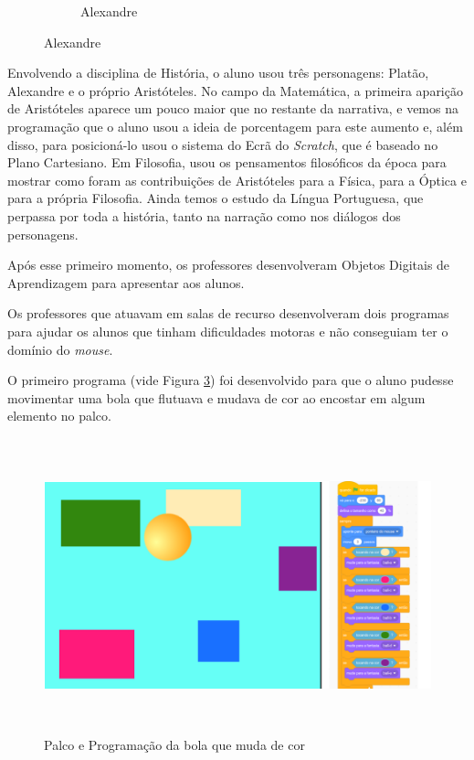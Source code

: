 \documentclass[12pt, openright, a4paper, brazil, english, french, spanish, bibjustif, openany, oneside]{abntex2}
\begin{document}
\begin{figure}[H]
\begin{subfigure}[b]{0.3\textwidth}
         \caption*{Alexandre}
         \label{alexandre}
     \end{subfigure}
     
    
\end{figure}

Envolvendo a disciplina de História, o aluno usou três personagens: Platão, Alexandre e o próprio Aristóteles. No campo da Matemática, a primeira aparição de Aristóteles aparece um pouco maior que no restante da narrativa, e vemos na programação que o aluno usou a ideia de porcentagem para este aumento e, além disso, para posicioná-lo usou o sistema do Ecrã do \textit{Scratch}, que é baseado no Plano Cartesiano. Em Filosofia, usou os pensamentos filosóficos da época para mostrar como foram as contribuições de Aristóteles para a Física, para a Óptica e para a própria Filosofia. Ainda temos o estudo da Língua Portuguesa, que perpassa por toda a história, tanto na narração como nos diálogos dos personagens. 

Após esse primeiro momento, os professores desenvolveram Objetos Digitais de Aprendizagem para apresentar aos alunos. 

Os professores que atuavam em salas de recurso desenvolveram dois programas para ajudar os alunos que tinham dificuldades motoras e não conseguiam ter o domínio do \textit{mouse}. 

O primeiro programa (vide Figura \ref{rec1}) foi desenvolvido para que o aluno pudesse movimentar uma bola que flutuava e mudava de cor ao encostar em algum elemento no palco.

\begin{figure}[H]

 \centering
 
         \caption{Palco e Programação da bola que muda de cor \label{rec1}}
         \includegraphics[height=8.5cm]{progcorbola.png}
    
\end{figure}
\end{document}
